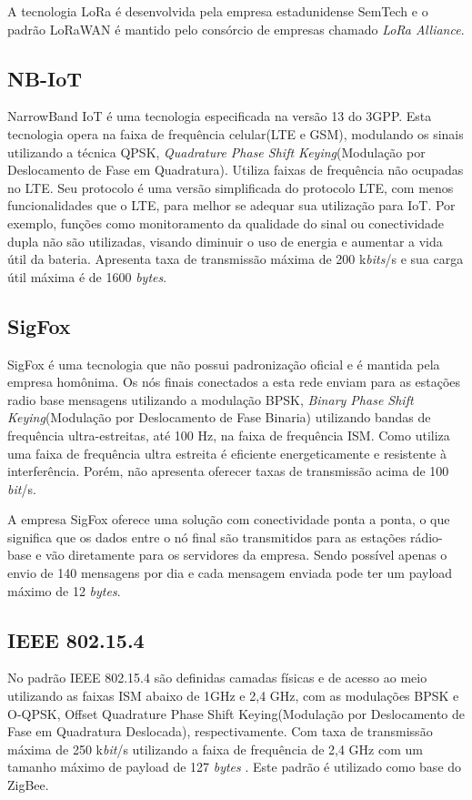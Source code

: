 A tecnologia LoRa é desenvolvida pela empresa estadunidense SemTech e o padrão LoRaWAN é mantido pelo consórcio de empresas chamado \emph{LoRa Alliance}.

\subsection{NB-IoT}
NarrowBand IoT é uma tecnologia especificada na versão 13 do 3GPP. Esta tecnologia opera na faixa de frequência celular(LTE e GSM), modulando os sinais utilizando a técnica QPSK, \emph{Quadrature Phase Shift Keying}(Modulação por Deslocamento de Fase em Quadratura). Utiliza faixas de frequência não ocupadas no LTE. Seu protocolo é uma versão simplificada do protocolo LTE, com menos funcionalidades que o LTE, para melhor se adequar sua utilização para IoT. Por exemplo, funções como monitoramento da qualidade do sinal ou conectividade dupla não são utilizadas, visando diminuir o uso de energia e aumentar a vida útil da bateria. Apresenta taxa de transmissão máxima de 200 k\emph{bits}/s e sua carga útil máxima é de 1600 \emph{bytes}.

\subsection{SigFox}
SigFox é uma tecnologia que não possui padronização oficial e é mantida pela empresa homônima. Os nós finais conectados a esta rede enviam para as estações radio base mensagens utilizando a modulação BPSK, \emph{Binary Phase Shift Keying}(Modulação por Deslocamento de Fase Binaria) utilizando bandas de frequência ultra-estreitas, até 100 Hz, na faixa de frequência ISM. Como utiliza uma faixa de frequência ultra estreita é eficiente energeticamente e resistente à interferência. Porém, não apresenta oferecer taxas de transmissão acima de 100 \emph{bit}/s.

A empresa SigFox oferece uma solução com conectividade ponta a ponta, o que significa que os dados entre o nó final são transmitidos para as estações rádio-base e vão diretamente para os servidores da empresa. Sendo possível apenas o envio de 140 mensagens por dia e cada mensagem enviada pode ter um payload máximo de 12 \emph{bytes}.

\subsection{IEEE 802.15.4}
No padrão IEEE 802.15.4 são definidas camadas físicas e de acesso ao meio utilizando as faixas ISM abaixo de 1GHz e 2,4 GHz, com as modulações BPSK e O-QPSK, Offset Quadrature Phase Shift Keying(Modulação por Deslocamento de Fase em Quadratura Deslocada), respectivamente. Com taxa de transmissão máxima de 250 k\emph{bit}/s utilizando a faixa de frequência de 2,4 GHz com um tamanho máximo de payload de 127 \emph{bytes} \cite{munoz2018overview} \cite{gomes2017estimaccao}. Este padrão é utilizado como base do ZigBee.

